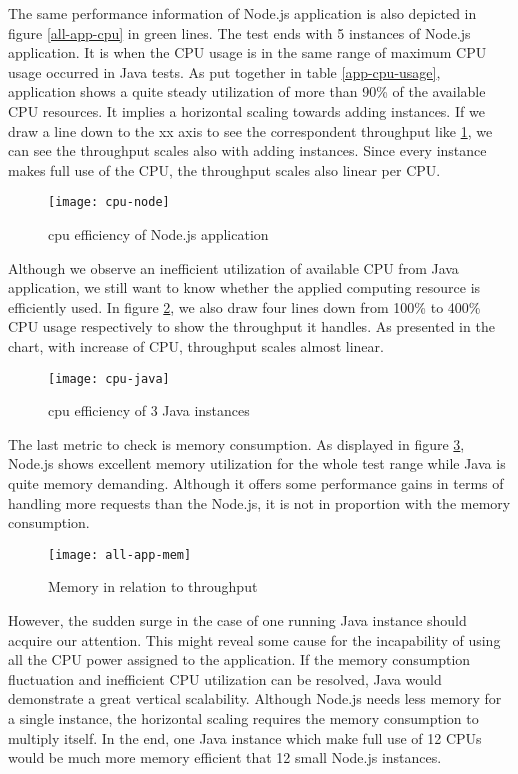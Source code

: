 The same performance information of Node.js application is also depicted in figure \ref{all-app-cpu} in green lines. The test ends with 5 instances of Node.js application. It is when the CPU usage is in the same range of maximum CPU usage occurred in Java tests. As put together in table \ref{app-cpu-usage}, application shows a quite steady utilization of more than 90\% of the available CPU resources. It implies a horizontal scaling towards adding instances. If we draw a line down to the xx axis to see the correspondent throughput like \ref{cpu-node}, we can see the throughput scales also with adding instances. Since every instance makes full use of the CPU, the throughput scales also linear per CPU. \\
 \begin{figure}[h]
	\centering
	\texttt{[image: cpu-node]}
	\caption{cpu efficiency of Node.js application}
	\label{cpu-node}
\end{figure}

Although we observe an inefficient utilization of available CPU from Java application, we still want to know whether the applied computing resource is efficiently used. In figure \ref{cpu-java}, we also draw four lines down from 100\% to 400\% CPU usage respectively to show the throughput it handles. As presented in the chart, with increase of CPU, throughput scales almost linear.
 \begin{figure}[h]
	\centering
	\texttt{[image: cpu-java]}
	\caption{cpu efficiency of 3 Java instances}
	\label{cpu-java}
\end{figure}

The last metric to check is memory consumption. As displayed in figure \ref{all-app-memory}, Node.js shows excellent memory utilization for the whole test range while Java is quite memory demanding. Although it offers some performance gains in terms of handling more requests than the Node.js, it is not in proportion with the memory consumption. \\

 \begin{figure}[h]
	\centering
	\texttt{[image: all-app-mem]}
	\caption{Memory in relation to throughput}
	\label{all-app-memory}
\end{figure}

However, the sudden surge in the case of one running Java instance should acquire our attention. This might reveal some cause for the incapability of using all the CPU power assigned to the application. If the memory consumption fluctuation and inefficient CPU utilization can be resolved,  Java would demonstrate a great vertical scalability. Although Node.js needs less memory for a single instance, the horizontal scaling requires the memory consumption to multiply itself. In the end, one Java instance which make full use of 12 CPUs would be much more memory efficient that 12 small Node.js instances. 